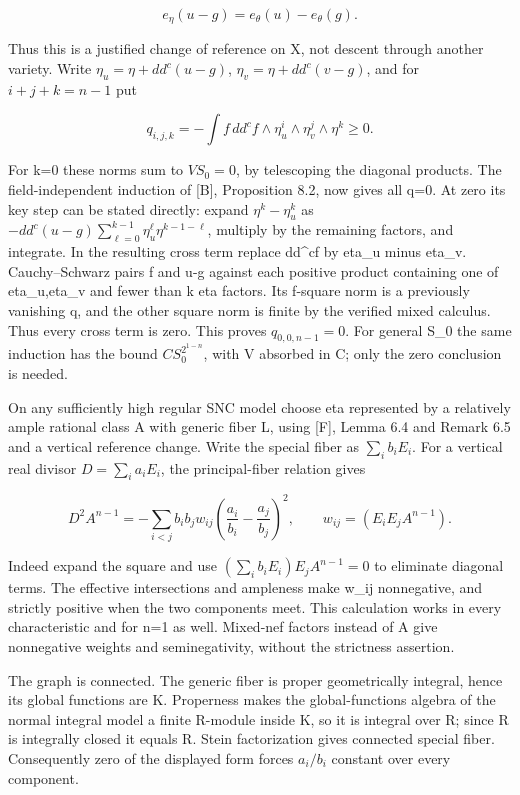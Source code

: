 \documentclass[11pt]{article}
\begin{document}
\[
e_\eta(u-g)=e_\theta(u)-e_\theta(g).
\]

Thus this is a justified change of reference on X, not descent through another variety. Write \(\eta_u=\eta+dd^c(u-g)\), \(\eta_v=\eta+dd^c(v-g)\), and for \(i+j+k=n-1\) put

\[
q_{i,j,k}=-\int f\,dd^cf\wedge\eta_u^i\wedge\eta_v^j\wedge\eta^k\geq0.
\]

For k=0 these norms sum to \(VS_0=0\), by telescoping the diagonal products. The field-independent induction of [B], Proposition 8.2, now gives all q=0. At zero its key step can be stated directly: expand \(\eta^k-\eta_u^k\) as \(-dd^c(u-g)\sum_{\ell=0}^{k-1}\eta_u^\ell\eta^{k-1-\ell}\), multiply by the remaining factors, and integrate. In the resulting cross term replace dd\textasciicircum{}cf by eta\_u minus eta\_v. Cauchy--Schwarz pairs f and u-g against each positive product containing one of eta\_u,eta\_v and fewer than k eta factors. Its f-square norm is a previously vanishing q, and the other square norm is finite by the verified mixed calculus. Thus every cross term is zero. This proves \(q_{0,0,n-1}=0\). For general S\_0 the same induction has the bound \(C S_0^{2^{1-n}}\), with V absorbed in C; only the zero conclusion is needed.

On any sufficiently high regular SNC model choose eta represented by a relatively ample rational class A with generic fiber L, using [F], Lemma 6.4 and Remark 6.5 and a vertical reference change. Write the special fiber as \(\sum_i b_iE_i\). For a vertical real divisor \(D=\sum_i a_iE_i\), the principal-fiber relation gives

\[
D^2A^{n-1}=-\sum_{i<j}b_ib_jw_{ij}
 \left(\frac{a_i}{b_i}-\frac{a_j}{b_j}\right)^2,
\qquad w_{ij}=(E_iE_jA^{n-1}).
\]

Indeed expand the square and use \((\sum_i b_iE_i)E_jA^{n-1}=0\) to eliminate diagonal terms. The effective intersections and ampleness make w\_ij nonnegative, and strictly positive when the two components meet. This calculation works in every characteristic and for n=1 as well. Mixed-nef factors instead of A give nonnegative weights and seminegativity, without the strictness assertion.

The graph is connected. The generic fiber is proper geometrically integral, hence its global functions are K. Properness makes the global-functions algebra of the normal integral model a finite R-module inside K, so it is integral over R; since R is integrally closed it equals R. Stein factorization gives connected special fiber. Consequently zero of the displayed form forces \(a_i/b_i\) constant over every component.
\end{document}

